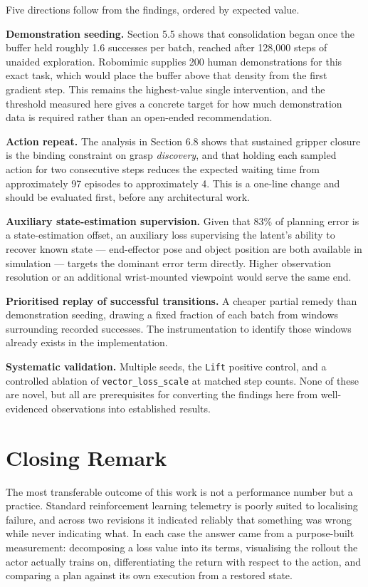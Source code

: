 \documentclass[12pt,a4paper,oneside]{report}
\begin{document}
Five directions follow from the findings, ordered by expected value.

\textbf{Demonstration seeding.} Section 5.5 shows that consolidation began once the
buffer held roughly 1.6 successes per batch, reached after 128,000 steps of
unaided exploration. Robomimic supplies 200 human demonstrations for this exact
task, which would place the buffer above that density from the first gradient
step. This remains the highest-value single intervention, and the threshold
measured here gives a concrete target for how much demonstration data is
required rather than an open-ended recommendation.

\textbf{Action repeat.} The analysis in Section 6.8 shows that sustained gripper
closure is the binding constraint on grasp \emph{discovery}, and that holding each
sampled action for two consecutive steps reduces the expected waiting time from
approximately 97 episodes to approximately 4. This is a one-line change and
should be evaluated first, before any architectural work.

\textbf{Auxiliary state-estimation supervision.} Given that 83\% of planning error is a
state-estimation offset, an auxiliary loss supervising the latent's ability to
recover known state --- end-effector pose and object position are both available
in simulation --- targets the dominant error term directly. Higher observation
resolution or an additional wrist-mounted viewpoint would serve the same end.

\textbf{Prioritised replay of successful transitions.} A cheaper partial remedy than
demonstration seeding, drawing a fixed fraction of each batch from windows
surrounding recorded successes. The instrumentation to identify those windows
already exists in the implementation.

\textbf{Systematic validation.} Multiple seeds, the \texttt{Lift} positive control, and a
controlled ablation of \texttt{vector\_loss\_scale} at matched step counts. None of these
are novel, but all are prerequisites for converting the findings here from
well-evidenced observations into established results.

\hypertarget{closing-remark}{%
\section{Closing Remark}\label{closing-remark}}

The most transferable outcome of this work is not a performance number but a
practice. Standard reinforcement learning telemetry is poorly suited to
localising failure, and across two revisions it indicated reliably that something
was wrong while never indicating what. In each case the answer came from a
purpose-built measurement: decomposing a loss value into its terms, visualising
the rollout the actor actually trains on, differentiating the return with respect
to the action, and comparing a plan against its own execution from a restored
state.
\end{document}
